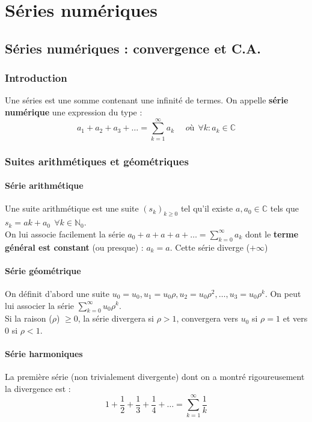 \documentclass	[11pt, a4paper, openany]{book}
\begin{document}
	\setcounter{chapter}{10}
	\chapter{Séries numériques}
	\section{Séries numériques : convergence et C.A.}
	\subsection{Introduction}
	Une séries est une somme contenant une infinité de termes. On appelle \textbf{série numérique} une expression du type :
	\begin{equation}
		a_1 + a_2 + a_3 + \dots = \sum_{k=1}^\infty a_k\ \ \ \ \ \ où\ \ \forall k : a_k \in \mathbb{C}
	\end{equation}
	
	\subsection{Suites arithmétiques et géométriques}
	\subsubsection{Série arithmétique}
	Une suite arithmétique est une suite $(s_k)_{k \geq 0}$ tel qu'il existe $a, a_0 \in \mathbb{C}$ tels que $s_k = ak + a_0\ \ \forall k \in \mathbb{N}_0$.\\
	On lui associe facilement la série $a_0 + a + a + a + \dots = \sum_{k=0}^\infty a_k$ dont  le \textbf{terme général est constant} (ou presque) : $a_k = a$.
	Cette série diverge ($+\infty$)
	
	\subsubsection{Série géométrique}
	On définit d'abord une suite $u_0 = u_0, u_1 = u_0\rho, u_2 = u_0\rho^2,\dots, u_3 = u_0\rho^k$. On peut lui associer la série $\sum_{k=0}^\infty u_0\rho^k$.\\
	Si la raison ($\rho$) $\geq 0$, la série divergera si $\rho > 1$, convergera vers $u_0$ si $\rho = 1$ et vers $0$ si $\rho < 1$.
	
	\subsubsection{Série harmoniques}
	La première série (non trivialement divergente) dont on a montré rigoureusement la divergence est :
	\begin{equation}
		1 + \frac{1}{2} + \frac{1}{3} + \frac{1}{4} + \dots = \sum_{k=1}^\infty \frac{1}{k}
	\end{equation}
	
\end{document}
